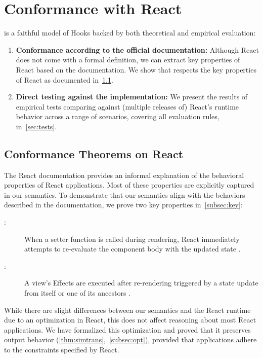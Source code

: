 \chapter{Conformance with React}\label{chap:rules}
\Rtrace{} is a faithful model of Hooks backed by both theoretical and empirical evaluation:
\begin{enumerate}
  \item \textbf{Conformance according to the official documentation:}
    Although React does not come with a formal definition, we can extract key properties of React based on the documentation.
    We show that \Rtrace{} respects the key properties of React as documented in~\cref{sec:key}.
  \item \textbf{Direct testing against the implementation:}
    We present the results of empirical tests comparing \Rtrace{} against (multiple releases of) React's runtime behavior across a range of scenarios, covering all evaluation rules, in~\cref{sec:tests}.
\end{enumerate}


\section{Conformance Theorems on React}\label{sec:key}
The React documentation provides an informal explanation of the behavioral properties of React applications.
Most of these properties are explicitly captured in our semantics.
To demonstrate that our semantics align with the behaviors described in the documentation, we prove two key properties in~\cref{subsec:key}:
\begin{description}
  \item[:] When a setter function is called during rendering, React immediately attempts to re-evaluate the component body with the updated state \citep{Met25UseState}.
  \item[:] A view's Effects are executed after re-rendering triggered by a state update from itself or one of its ancestors \citep{Met25Render}.
\end{description}

While there are slight differences between our semantics and the React runtime due to an optimization in React, this does not affect reasoning about most React applications.
We have formalized this optimization and proved that it preserves output behavior (\cref{thm:simtrans},~\cref{subsec:opt}), provided that applications adhere to the constraints specified by React.


